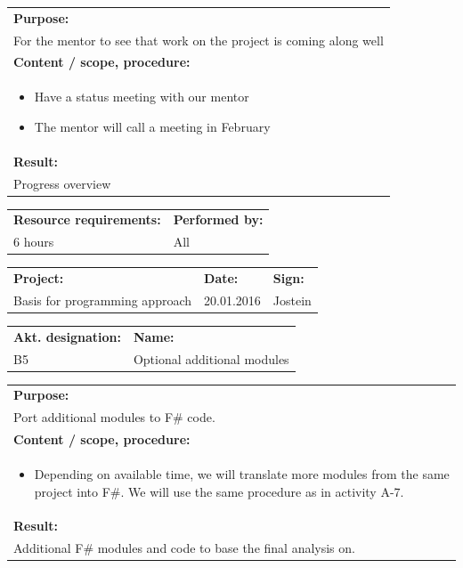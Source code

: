 \documentclass[12pt, a4paper]{article}
\begin{document}
\begin{tabularx}{\textwidth}{|X|}
	\textbf{Purpose:}\\
	For the mentor to see that work on the project is coming along well\\
	\hline
	\textbf{Content / scope, procedure:}\\
	\begin{itemize}
		\item Have a status meeting with our mentor 
		\item The mentor will call a meeting in February

	\end{itemize}\\
 	\hline
	\textbf{Result:}\\
	Progress overview\\
	\hline
\end{tabularx}

\begin{tabularx}{\textwidth}{|X|p{30mm}|}
	\textbf{Resource requirements:}&\textbf{Performed by:}\\
	6 hours&All\\
	\hline
\end{tabularx}

\newpage

\begin{tabularx}{\textwidth}{|X|p{32mm}|p{20mm}|}
	\hline
	\textbf{Project:}&\textbf{Date:}&\textbf{Sign:}\\
	Basis for programming approach&20.01.2016&Jostein\\
	\hline
\end{tabularx}

\begin{tabularx}{\textwidth}{|p{40mm}|X|}
	\textbf{Akt. designation:}&\textbf{Name:}\\
	B5&Optional additional modules  \\
	\hline
\end{tabularx}

\begin{tabularx}{\textwidth}{|X|}
	\textbf{Purpose:}\\
	Port additional modules to F\# code.\\
	\hline
	\textbf{Content / scope, procedure:}\\
	\begin{itemize}
		\item Depending on available time, we will translate more modules from the same project into F\#. We will use the same procedure as in activity A-7.
	\end{itemize}\\
 	\hline
	\textbf{Result:}\\
	Additional F\# modules and code to base the final analysis on. \\
	\hline
\end{tabularx}
\end{document}
